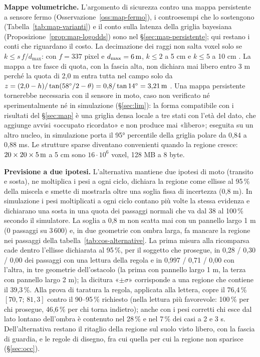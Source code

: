 \textbf{Mappe volumetriche.} L'argomento di sicurezza contro una mappa persistente a sensore fermo (Osservazione~\ref{oss:map-fermo}), i controesempi che lo sostengono (Tabella~\ref{tab:map-varianti}) e il conto sulla latenza della griglia bayesiana (Proposizione~\ref{prop:map-logodds}) sono nel \S\ref{sec:map-persistente}; qui restano i conti che riguardano il costo. La decimazione dei raggi non salta voxel solo se $k\le s\,f/d_{\max}$: con $f=337$ pixel e $d_{\max}=6\,\mathrm{m}$, $k\le2$ a 5 cm e $k\le5$ a 10 cm . La mappa a tre fasce di quota, con la fascia alta, non dichiara mai libero entro 3 m perché la quota di 2,0 m entra tutta nel campo solo da $z=(2{,}0-h)/\tan(58^\circ/2-\theta)=0{,}8/\tan14^\circ=3{,}21\,\mathrm{m}$ . Una mappa persistente tornerebbe necessaria con il sensore in moto, caso non verificato né sperimentalmente né in simulazione (\S\ref{sec:lim}): la forma compatibile con i risultati del \S\ref{sec:map} è una griglia densa locale a tre stati con l'età del dato, che aggiunge avvisi «occupato ricordato» e non produce mai «libero»; eseguita su un altro nucleo, in simulazione porta il 95° percentile della griglia polare da 0,84 a 0,88 ms. Le strutture sparse diventano convenienti quando la regione cresce: $20\times20\times5\,\mathrm{m}$ a 5 cm sono $16\cdot10^6$ voxel, 128 MB a 8 byte.

\textbf{Previsione a due ipotesi.} L'alternativa mantiene due ipotesi di moto (transito e sosta), ne moltiplica i pesi a ogni ciclo, dichiara la regione come ellisse al 95\,\% della miscela e smette di mostrarla oltre una soglia fissa di incertezza (0,8 m). In simulazione i pesi moltiplicati a ogni ciclo contano più volte la stessa evidenza e dichiarano una sosta in una quota dei passaggi normali che va dal 38 al 100\,\% secondo il simulatore. La soglia a 0,8 m non scatta mai con un pannello largo 1 m (0 passaggi su $3\,600$) e, in due geometrie con ombra larga, fa mancare la regione nei passaggi della tabella~\ref{tab:cos-alternative}. La prima misura alla ricomparsa cade dentro l'ellisse dichiarata al 95\,\%, per il soggetto che prosegue, in 0,28 / 0,30 / 0,00 dei passaggi con una lettura della regola e in 0,997 / 0,71 / 0,00 con l'altra, in tre geometrie dell'ostacolo (la prima con pannello largo 1 m, la terza con pannello largo 2 m); la dicitura «$\pm\sigma$» corrisponde a una regione che contiene il 39,3\,\%. Alla prova di taratura la regola, applicata alla lettera, copre il 76,4\,\% $[70{,}7;\,81{,}3]$ contro il 90--95\,\% richiesto (nella lettura più favorevole: 100\,\% per chi prosegue, 46,6\,\% per chi torna indietro); anche con i pesi corretti chi esce dal lato lontano dell'ombra è contenuto nel 28\,\% e nel 7\,\% dei casi a 2 e 3 s. Dell'alternativa restano il ritaglio della regione sul suolo visto libero, con la fascia di guardia, e le regole di disegno, fra cui quella per cui la regione non sparisce (\S\ref{sec:occ}). 

